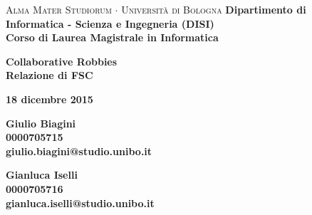 \begin{list}{}{
  \setlength{\topsep}{20pt}
  \setlength{\leftmargin}{-40pt}%
  \setlength{\rightmargin}{-80pt}%
  \setlength{\listparindent}{0pt}%
  \setlength{\itemindent}{0pt}%
  \setlength{\parsep}{0pt}%
 }%
\item[]
\thispagestyle{empty}

\begin{center}
{{\center \fontsize{17.4}{60}\selectfont \textsc{Alma Mater Studiorum $\cdot$ Università di Bologna}}}
\noindent\makebox[\linewidth]{\rule[0.1cm]{15.8cm}{0.1mm}}
\noindent\makebox[\linewidth]{\rule[0.5cm]{15.8cm}{0.6mm}}
{\small{\bf Dipartimento di Informatica - Scienza e Ingegneria (DISI)\\
Corso di Laurea Magistrale in Informatica}}

\end{center}
\vspace{40mm}
\begin{center}
{\LARGE{\bf Collaborative Robbies}}\\
\vspace{3mm} {\large{\bf Relazione di FSC}}
\end{center}
\vspace{20mm}
\begin{center}
{\large{\bf 18 dicembre 2015}}
\end{center}
\vspace{50mm}
\par
\noindent
\begin{minipage}[t]{0.54\textwidth}\raggedright
{\large{\bf Giulio Biagini\\
0000705715\\
giulio.biagini@studio.unibo.it\vspace{\baselineskip}}}\\
\end{minipage}
\hfill
\begin{minipage}[t]{0.54\textwidth}\raggedleft
{\large{\bf Gianluca Iselli\\
0000705716\\
gianluca.iselli@studio.unibo.it}}
\end{minipage}

\end{list}
